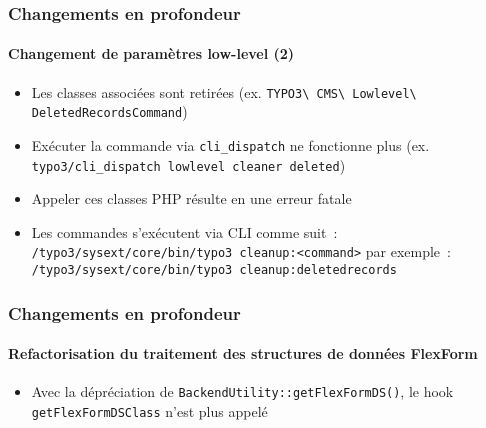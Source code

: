 \begin{frame}[fragile]
	\frametitle{Changements en profondeur}
	\framesubtitle{Changement de paramètres low-level (2)}


	\begin{itemize}
		\item Les classes associées sont retirées\newline
			\smaller(ex. \texttt{TYPO3\textbackslash
				CMS\textbackslash
				Lowlevel\textbackslash
				DeletedRecordsCommand})
			\normalsize

		\item Exécuter la commande via \texttt{cli\_dispatch} ne fonctionne plus\newline
			\smaller(ex. \texttt{typo3/cli\_dispatch lowlevel cleaner deleted})\normalsize
		\item Appeler ces classes PHP résulte en une erreur fatale

		\item Les commandes s'exécutent via CLI comme suit~:\newline
			\smaller\texttt{/typo3/sysext/core/bin/typo3 cleanup:<command>}\normalsize\newline
			par exemple~:\newline
			\smaller\texttt{/typo3/sysext/core/bin/typo3 cleanup:deletedrecords}\normalsize

	\end{itemize}

\end{frame}




\begin{frame}[fragile]
	\frametitle{Changements en profondeur}
	\framesubtitle{Refactorisation du traitement des structures de données FlexForm}


	\begin{itemize}
		\item Avec la dépréciation de \texttt{BackendUtility::getFlexFormDS()}, le hook
			\texttt{getFlexFormDSClass} n'est plus appelé

	\end{itemize}

\end{frame}





